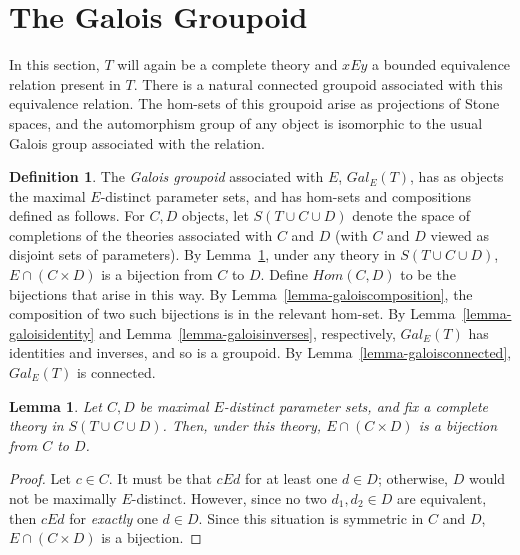 \documentclass[letterpaper,twoside]{article}
\newtheorem{lemma}{Lemma}[theorem]
\theoremstyle{definition}
\newtheorem{definition}[theorem]{Definition}
\theoremstyle{remark}
\newcommand{\defterm}[1]{\emph{#1}}
\begin{document}
\section{The Galois Groupoid}

In this section, \(T\) will again be a complete theory and \(xEy\) a
bounded equivalence relation present in \(T\).  There is a natural
connected groupoid associated with this equivalence relation.  The
hom-sets of this groupoid arise as projections of Stone spaces, and
the automorphism group of any object is isomorphic to the usual Galois
group associated with the relation.

\begin{definition}
  The \defterm{Galois groupoid} associated with \(E\), \(Gal_E(T)\),
  has as objects the maximal \(E\)-distinct parameter sets, and has
  hom-sets and compositions defined as follows.  For \(C, D\) objects,
  let \(S(T \cup C \cup D)\) denote the space of completions of the
  theories associated with \(C\) and \(D\) (with \(C\) and \(D\)
  viewed as disjoint sets of parameters).  By
  Lemma~\ref{lemma-galoisbijection}, under any theory in \(S(T \cup C
  \cup D)\), \(E \cap (C \times D)\) is a bijection from \(C\) to
  \(D\).  Define \(Hom(C,D)\) to be the bijections that arise in this
  way.  By Lemma~\ref{lemma-galoiscomposition}, the composition of two
  such bijections is in the relevant hom-set.  By
  Lemma~\ref{lemma-galoisidentity} and
  Lemma~\ref{lemma-galoisinverses}, respectively, \(Gal_E(T)\) has
  identities and inverses, and so is a groupoid.  By
  Lemma~\ref{lemma-galoisconnected}, \(Gal_E(T)\) is connected.
\end{definition}

\begin{lemma}\label{lemma-galoisbijection}
  Let \(C, D\) be maximal \(E\)-distinct parameter sets, and fix a
  complete theory in \(S(T \cup C \cup D)\).  Then, under this theory,
  \(E \cap (C \times D)\) is a bijection from \(C\) to \(D\).
\end{lemma}
\begin{proof}
  Let \(c \in C\).  It must be that \(cEd\) for at least one \(d \in
  D\); otherwise, \(D\) would not be maximally \(E\)-distinct.
  However, since no two \(d_1,d_2 \in D\) are equivalent, then \(cEd\)
  for \emph{exactly} one \(d \in D\).  Since this situation is
  symmetric in \(C\) and \(D\), \(E \cap (C \times D)\) is a
  bijection.
\end{proof}
\end{document}

